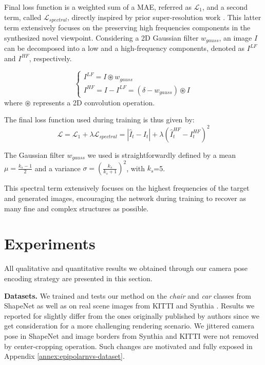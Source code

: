 Final loss function is a weighted sum  of a \ac{MAE}, referred as $\mathcal{L}_{1}$, and a second term, called $\mathcal{L}_{spectral}$, directly inspired by prior super-resolution work \citep{fritsche2019frequency}. This latter term extensively focuses on the preserving high frequencies components in the synthesized novel viewpoint. Considering a 2D Gaussian filter $w_{gauss}$, an image $I$ can be decomposed into a low and a high-frequency components, denoted as $I^{LF}$ and $I^{HF}$, respectively. 

\begin{equation}
\begin{cases}
     I^{LF}  = I\circledast w_{gauss} \\
     I^{HF} = I - I^{LF} = (\delta - w_{gauss})\circledast I
\end{cases}
\end{equation}
where $\circledast$ represents a 2D convolution operation. 

The final loss function used during training is thus given by: 
\begin{equation}
    \mathcal{L} = \mathcal{L}_{1} + \lambda \mathcal{L}_{spectral} = |\hat{I}_{t} - I_{t}| + \lambda \left( \hat{I}_{t}^{HF} - I_{t}^{HF} \right)^{2}
    \label{eq:1}
\end{equation}
 \newline

The Gaussian filter $w_{gauss}$ we used is straightforwardly defined by a mean $\mu = \frac{k_{s}-1}{2}$ and a variance $\sigma = (\frac{k_{s}}{k_{s}+1})^{2}$, with $k_{s}$=5.

This spectral term extensively focuses on the highest frequencies of the target and generated images, encouraging the network during training to recover as many fine and complex structures as possible.

\section{Experiments}
All qualitative and quantitative results we obtained through our camera pose encoding strategy are presented in this section. \newline

\noindent\textbf{Datasets.} We trained and tests our method on the \textit{chair} and \textit{car} classes from ShapeNet \citep{chang2015shapenet} as well as on real scene images from KITTI \citep{geiger2012we} and Synthia \citep{ros2016synthia}.
Results we reported for \citep{kim2020novel} slightly differ from the ones originally published by authors since we get consideration for a more challenging rendering scenario. We jittered camera pose in ShapeNet \citep{chang2015shapenet} and image borders from Synthia \citep{ros2016synthia} and KITTI \citep{geiger2012we} were not removed by center-cropping operation. Such changes are motivated and fully exposed in Appendix \ref{annex:epipolarnvs-dataset}.  \newline

